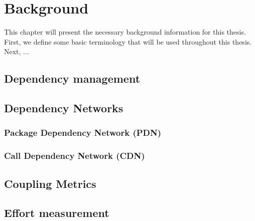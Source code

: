 \chapter{Background}\label{ch:Background}
This chapter will present the necessary background information for this thesis. First, we define some basic terminology that will be used throughout this thesis. Next, ...

\section{Dependency management}

\section{Dependency Networks}
\subsection{Package Dependency Network (PDN)}
\subsection{Call Dependency Network (CDN)}

\section{Coupling Metrics}

\section{Effort measurement}
